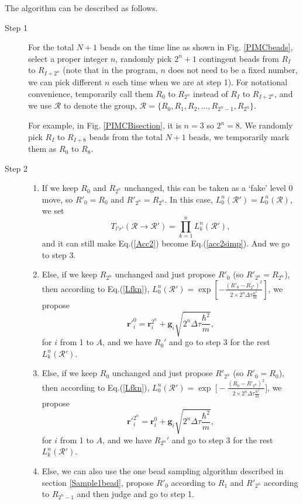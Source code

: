 \documentclass[12pt,letterpaper,UTF8]{report}
\begin{document}
The algorithm can be described as follows.
\begin{description}
  \item[Step 1] For the total $N+1$ beads on the time line as shown in Fig. \ref{PIMCbeads}, select a proper integer $n$, randomly pick $2^n+1$ contingent beads from $R_I$ to $R_{I+2^n}$ (note that in the program, $n$ does not need to be a fixed number, we can pick different $n$ each time when we are at step 1).
  For notational convenience, temporarily call them $R_0$ to $R_{2^n}$ instead of $R_I$ to $R_{I+2^n}$, and we use $\mathcal{R}$ to denote the group, $\mathcal{R}=\{R_0, R_1, R_2, ..., R_{2^n-1}, R_{2^n} \}$.

  For example, in Fig. \ref{PIMCBisection}, it is $n=3$ so $2^n=8$. We randomly pick $R_I$ to $R_{I+8}$ beads from the total $N+1$ beads, we temporarily mark them as $R_0$ to $R_8$.

  \item[Step 2]
  \begin{enumerate}
  \item If we keep $R_0$ and $R_{2^n}$ unchanged, this can be taken as a `fake' level 0 move, so $R'_0=R_0$ and $R'_{2^n}=R_{2^n}$. In this case, $L^n_0(\mathcal{R}') = L^n_0(\mathcal{R}) $, we set
    \begin{equation}
T_{l'r'}(\mathcal{R} \rightarrow \mathcal{R}') = \prod_{k=1}^{n} L^n_k(\mathcal{R}') ,
 \label{Tlrnewmbeadsf1}
\end{equation}
    and it can still make Eq.(\ref{Acc2}) become Eq.(\ref{acc2simp}). And we go to step 3.
  \item  Else, if we keep $R_{2^n}$ unchanged and just propose $R'_0$ (so $R'_{2^n}=R_{2^n}$), then according to Eq.(\ref{Lfkn}), $L^n_0(\mathcal{R}')=\exp \left[ - \frac{(R'_0-R_{2^n})^2}{2\times 2^n \Delta \tau \frac{\hbar^2}{m}  } \right]$, we propose
      \begin{equation}
  {\bm{r}'}_i^0 =
   {\bm{r}}_i^{2^n}
  + \bm{g}_i \sqrt{ 2^n\Delta \tau \frac{\hbar^2}{m}} ,
 \label{}
\end{equation}
    for $i$ from 1 to $A$, and we have $R_0'$ and go to step 3 for the rest $L^n_k(\mathcal{R}')$.
  \item     Else, if we keep $R_{0}$ unchanged and just propose $R'_{2^n}$ (so $R'_0=R_0$), then according to Eq.(\ref{Lfkn}), $L^n_0(\mathcal{R}')=\exp\ \Big[ - \frac{(R_0-R'_{2^n})^2}{2\times 2^n \Delta \tau \frac{\hbar^2}{m}  } \Big]$, we propose
      \begin{equation}
  {\bm{r}'}_i^{2^n} =
   {\bm{r}}_i^{0}
  + \bm{g}_i \sqrt{ 2^n\Delta \tau \frac{\hbar^2}{m}} ,
 \label{}
\end{equation}
   for $i$ from 1 to $A$, and we have $R_{2^n}'$ and go to step 3 for the rest $L^n_k(\mathcal{R}')$.
   \item
    Else, we can also use the one bead sampling algorithm described in section \ref{Sample1bead}, propose $R'_0$ according to $R_1$ and $R'_{2^n}$ according to $R_{2^n-1}$ and then judge and go to step 1.
\end{enumerate}


\end{description}
\end{document}
